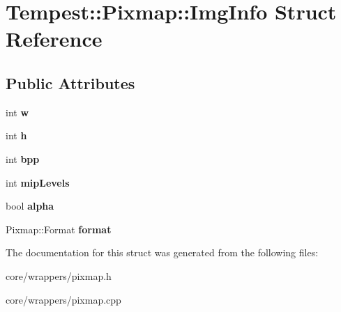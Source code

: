 \hypertarget{struct_tempest_1_1_pixmap_1_1_img_info}{\section{Tempest\+:\+:Pixmap\+:\+:Img\+Info Struct Reference}
\label{struct_tempest_1_1_pixmap_1_1_img_info}
}
\subsection*{Public Attributes}
\begin{DoxyCompactItemize}
\item 
\hypertarget{struct_tempest_1_1_pixmap_1_1_img_info_a4b773c6cfce7063bd6dec9689e8783ff}{int {\bfseries w}}\label{struct_tempest_1_1_pixmap_1_1_img_info_a4b773c6cfce7063bd6dec9689e8783ff}

\item 
\hypertarget{struct_tempest_1_1_pixmap_1_1_img_info_ae2d796b27cfcc35d10e500894464bde5}{int {\bfseries h}}\label{struct_tempest_1_1_pixmap_1_1_img_info_ae2d796b27cfcc35d10e500894464bde5}

\item 
\hypertarget{struct_tempest_1_1_pixmap_1_1_img_info_a39a853c8bb323aebf4c007aaab4f29d4}{int {\bfseries bpp}}\label{struct_tempest_1_1_pixmap_1_1_img_info_a39a853c8bb323aebf4c007aaab4f29d4}

\item 
\hypertarget{struct_tempest_1_1_pixmap_1_1_img_info_a65d38b8faed2ace2f29bdc6d0a9e0192}{int {\bfseries mip\+Levels}}\label{struct_tempest_1_1_pixmap_1_1_img_info_a65d38b8faed2ace2f29bdc6d0a9e0192}

\item 
\hypertarget{struct_tempest_1_1_pixmap_1_1_img_info_a3ac71c6e52c4c869778e347f01c83437}{bool {\bfseries alpha}}\label{struct_tempest_1_1_pixmap_1_1_img_info_a3ac71c6e52c4c869778e347f01c83437}

\item 
\hypertarget{struct_tempest_1_1_pixmap_1_1_img_info_aae2b042545b3eeb3ea26c754bd3746d4}{Pixmap\+::\+Format {\bfseries format}}\label{struct_tempest_1_1_pixmap_1_1_img_info_aae2b042545b3eeb3ea26c754bd3746d4}

\end{DoxyCompactItemize}


The documentation for this struct was generated from the following files\+:\begin{DoxyCompactItemize}
\item 
core/wrappers/pixmap.\+h\item 
core/wrappers/pixmap.\+cpp\end{DoxyCompactItemize}
